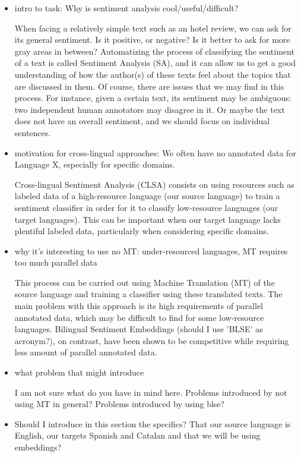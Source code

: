 \documentclass[11pt,a4paper]{article}
\begin{document}
\begin{itemize}
\item intro to task: Why is sentiment analysis cool/useful/difficult?

When facing a relatively simple text such as an hotel review, we can ask for its general sentiment. Is it positive, or negative? Is it better to ask for more gray areas in between? Automatizing the process of classifying the sentiment of a text is called Sentiment Analysis (SA), and it can allow us to get a good understanding of how the author(s) of these texts feel about the topics that are discussed in them. Of course, there are issues that we may find in this process. For instance, given a certain text, its sentiment may be ambiguous: two independent human annotators may disagree in it. Or maybe the text does not have an overall sentiment, and we should focus on individual sentences.

\item motivation for cross-lingual approaches: We often have no annotated data for Language X, especially for specific domains.

Cross-lingual Sentiment Analysis (CLSA) consists on using resources such as labeled data of a high-resource language (our source language) to train a sentiment classifier in order for it to classify low-resource languages (our target languages). This can be important when our target language lacks plentiful labeled data, particularly when considering specific domains. 

\item why it's interesting to use no MT: under-resourced languages, MT requires too much parallel data

This process can be carried out using Machine Translation (MT) of the source language and training a classifier using these translated texts. The main problem with this approach is its high requirements of parallel annotated data, which may be difficult to find for some low-resource languages. Bilingual Sentiment Embeddings (should I use 'BLSE' as acronym?), on contrast, have been shown to be competitive while requiring less amount of parallel annotated data.

\item what problem that might introduce

I am not sure what do you have in mind here. Problems introduced by not using MT in general? Problems introduced by using blse?

\item Should I introduce in this section the specifics? That our source language is English, our targets Spanish and Catalan and that we will be using embeddings?

\end{itemize}
\end{document}
